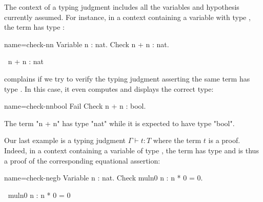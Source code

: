 The context of a typing judgment includes all the variables and
hypothesis currently assumed. %
For instance, in a context containing a variable  with
type , the term  has type :

\begin{coq-left}{name=check-nn}{}
Variable n : nat.
Check n + n : nat.
\end{coq-left}
\begin{coqout-right}
$~$
n + n : nat
\end{coqout-right}

\Coq{} complains if we try to verify the typing judgment asserting the
same term has type . In this case, it even computes and displays the
correct type:

\begin{coq-left}{name=check-nnbool}{}
Fail Check n + n : bool.
$~$
\end{coq-left}
\begin{coqout-right}
The term "n + n" has type "nat" while it is expected to have type "bool".
\end{coqout-right}

Our last example is a typing judgment  $\Gamma \vdash t : T$ where
the term $t$ is a proof. Indeed, in a context containing a
variable  of type , the term
 has type  and is thus a proof of the
corresponding equational assertion:

\begin{coq-left}{name=check-negb}{}
Variable n : nat.
Check muln0 n : n * 0 = 0.
\end{coq-left}
\begin{coqout-right}
$~$
muln0 n : n * 0 = 0
\end{coqout-right}

% 


